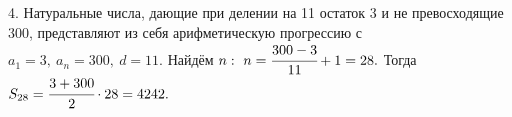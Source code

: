 4. Натуральные числа, дающие при делении на 11 остаток 3 и не превосходящие 300, представляют из себя арифметическую прогрессию с $a_1=3,\ a_n=300,\ d=11.$ Найдём $n:\ n=\cfrac{300-3}{11}+1=28.$ Тогда $S_{28}=\cfrac{3+300}{2}\cdot28=4242.$\\
